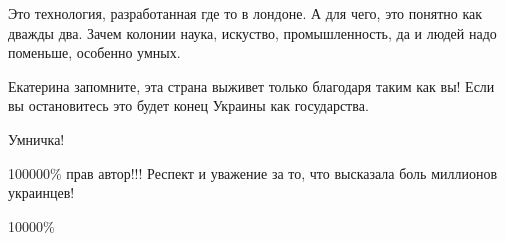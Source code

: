 \begin{itemize}
\begin{itemize}

Это технология, разработанная где то в лондоне. А для чего, это понятно как
дважды два. Зачем колонии наука, искуство, промышленность, да и людей надо
поменьше, особенно умных.

\end{itemize}

Екатерина запомните, эта страна выживет только благодаря таким как вы! Если вы
остановитесь это будет конец Украины как государства.

Умничка!

100000\% прав автор!!! Респект и уважение за то, что высказала боль миллионов
украинцев!

10000\%

\end{itemize}

